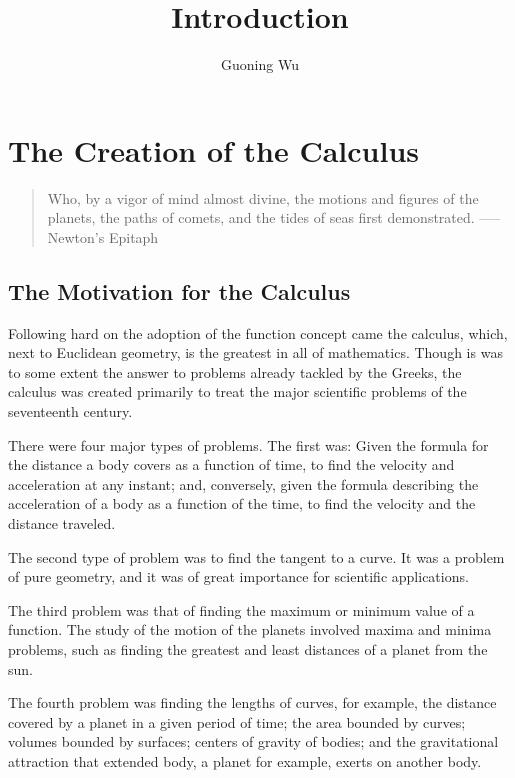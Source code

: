 \documentclass[a4paper,12pt]{article} %
\title{Introduction}
\author{Guoning Wu}
\begin{document}
\graphicspath{{../Figs/}}

\setcounter{tocdepth}{2}


\maketitle

\section{The Creation of the Calculus}
\begin{quote}
    {\color{red}Who, by a vigor of mind almost divine, the motions and figures 
    of the planets, the paths of comets, and the tides of seas first 
    demonstrated. -----Newton's Epitaph}
\end{quote}
\subsection{The Motivation for the Calculus}
Following hard on the adoption of the function concept came the 
calculus, which, next to Euclidean geometry, is the greatest 
in all of mathematics. Though is was to some extent the answer  
to problems already tackled by the Greeks, the calculus was 
created primarily to treat the major scientific problems of the 
seventeenth century.

There were four major types of problems. The first was: Given 
the formula for the distance a body covers as a function of time,
to find the velocity and acceleration at any instant; and, 
conversely, given the formula describing the acceleration of a 
body as a function of the time, to find the velocity and the 
distance traveled.

The second type of problem was to find the tangent to a curve.
It was a problem of pure geometry, and it was of great importance 
for scientific applications.

The third problem was that of finding the maximum or minimum 
value of a function. The study of the motion of the planets 
involved maxima and minima problems, such as finding the 
greatest and least distances of a planet from the sun.

The fourth problem was finding the lengths of curves, for 
example, the distance covered by a planet in a given period 
of time; the area bounded by curves; volumes bounded by 
surfaces; centers of gravity of bodies; and the gravitational 
attraction that extended body, a planet for example, exerts on 
another body.
\end{document}
